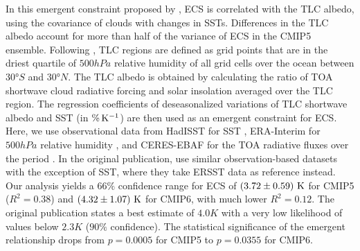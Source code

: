 In this emergent constraint proposed by \textcite{Brient2016}, \ac{ECS} is
correlated with the \ac{TLC} albedo, \ie{} using the covariance of clouds with
changes in \acp{SST}. Differences in the \ac{TLC} albedo account for more than
half of the variance of \ac{ECS} in the \acs{CMIP}5 ensemble. Following
\textcite{Brient2016}, \ac{TLC} regions are defined as grid points that are in
the driest quartile of $500 \unit{hPa}$ relative humidity of all grid cells
over the ocean between $30 \unit{\degree S}$ and $30 \unit{\degree N}$. The
\ac{TLC} albedo is obtained by calculating the ratio of \ac{TOA} shortwave
cloud radiative forcing and solar insolation averaged over the \ac{TLC} region.
The regression coefficients of deseasonalized variations of \ac{TLC} shortwave
albedo and \ac{SST} (in $\si{\pctK{}}$) are then used as an emergent constraint
for \ac{ECS}. Here, we use observational data from HadISST for \ac{SST}
\autocite{Rayner2003}, ERA-Interim for $500 \unit{hPa}$ relative humidity
\autocite{Dee2011}, and CERES-EBAF \autocite{Loeb2018} for the \ac{TOA}
radiative fluxes over the period . In the original
publication, \textcite{Brient2016} use similar observation-based datasets with
the exception of \ac{SST}, where they take ERSST data \autocite{Smith2003} as
reference instead. Our analysis yields a $66 \unit{\%}$ confidence range for
\ac{ECS} of $\pmrangeunit{3.72}{0.59}{K}$ for \acs{CMIP}5 ($R^2 = 0.38$) and
$\pmrangeunit{4.32}{1.07}{K}$ for \acs{CMIP}6, with much lower $R^2 = 0.12$.
The original publication states a best estimate of $4.0 \unit{K}$ with a very
low likelihood of values below $2.3 \unit{K}$ ($90 \unit{\%}$ confidence). The
statistical significance of the emergent relationship drops from $p = 0.0005$
for \acs{CMIP}5 to $p = 0.0355$ for \acs{CMIP}6.

